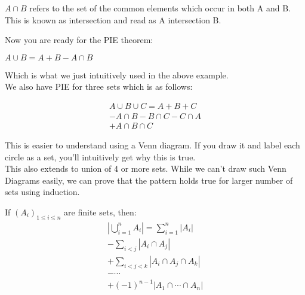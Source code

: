 \begin{definition}
    $A \cap B$ refers to the set of the common elements which occur in both A and B. This is known as intersection and read as A intersection B.    
\end{definition}
Now you are ready for the PIE theorem:
\begin{theorem}
    $A \cup B = A + B - A \cap B$
\end{theorem}
Which is what we just intuitively used in the above example.\\
We also have PIE for three sets which is as follows:
\begin{theorem}
    \begin{multline*}
        A \cup B \cup C = A + B + C \\
        - A \cap B - B \cap C - C \cap A \\
        + A \cap B \cap C
    \end{multline*}    
\end{theorem}
This is easier to understand using a Venn diagram. If you draw it and label each circle as a set, you'll intuitively get why this is true.\\
This also extends to union of 4 or more sets. While we can't draw such Venn Diagrams easily, we can prove that the pattern holds true for larger number of sets using induction.
\begin{theorem}
    If $(A_i)_{1\leq i\leq n}$ are finite sets, then:
\begin{multline*}
    \left|\bigcup_{i=1}^n A_i\right|=\sum_{i=1}^n\left|A_i\right| \\
    -\sum_{i < j}\left|A_i\cap A_j\right|\\
    +\sum_{i<j<k}\left|A_i\cap A_j\cap A_k\right|\\
    -\cdots\ \\
    +(-1)^{n-1} \left|A_1\cap\cdots\cap A_n\right|{}
\end{multline*}
\end{theorem}
